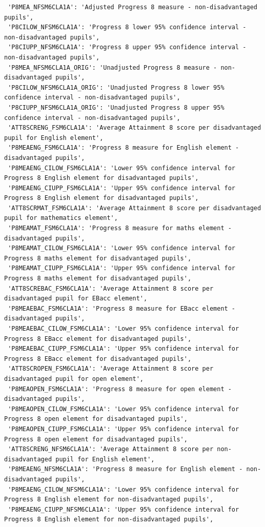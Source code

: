 \documentclass[
  letterpaper,
  DIV=11,
  numbers=noendperiod]{scrartcl}
\begin{document}
\begin{verbatim}
 'P8MEA_NFSM6CLA1A': 'Adjusted Progress 8 measure - non-disadvantaged pupils',
 'P8CILOW_NFSM6CLA1A': 'Progress 8 lower 95% confidence interval - non-disadvantaged pupils',
 'P8CIUPP_NFSM6CLA1A': 'Progress 8 upper 95% confidence interval - non-disadvantaged pupils',
 'P8MEA_NFSM6CLA1A_ORIG': 'Unadjusted Progress 8 measure - non-disadvantaged pupils',
 'P8CILOW_NFSM6CLA1A_ORIG': 'Unadjusted Progress 8 lower 95% confidence interval - non-disadvantaged pupils',
 'P8CIUPP_NFSM6CLA1A_ORIG': 'Unadjusted Progress 8 upper 95% confidence interval - non-disadvantaged pupils',
 'ATT8SCRENG_FSM6CLA1A': 'Average Attainment 8 score per disadvantaged pupil for English element',
 'P8MEAENG_FSM6CLA1A': 'Progress 8 measure for English element - disadvantaged pupils',
 'P8MEAENG_CILOW_FSM6CLA1A': 'Lower 95% confidence interval for Progress 8 English element for disadvantaged pupils',
 'P8MEAENG_CIUPP_FSM6CLA1A': 'Upper 95% confidence interval for Progress 8 English element for disadvantaged pupils',
 'ATT8SCRMAT_FSM6CLA1A': 'Average Attainment 8 score per disadvantaged pupil for mathematics element',
 'P8MEAMAT_FSM6CLA1A': 'Progress 8 measure for maths element - disadvantaged pupils',
 'P8MEAMAT_CILOW_FSM6CLA1A': 'Lower 95% confidence interval for Progress 8 maths element for disadvantaged pupils',
 'P8MEAMAT_CIUPP_FSM6CLA1A': 'Upper 95% confidence interval for Progress 8 maths element for disadvantaged pupils',
 'ATT8SCREBAC_FSM6CLA1A': 'Average Attainment 8 score per disadvantaged pupil for EBacc element',
 'P8MEAEBAC_FSM6CLA1A': 'Progress 8 measure for EBacc element - disadvantaged pupils',
 'P8MEAEBAC_CILOW_FSM6CLA1A': 'Lower 95% confidence interval for Progress 8 EBacc element for disadvantaged pupils',
 'P8MEAEBAC_CIUPP_FSM6CLA1A': 'Upper 95% confidence interval for Progress 8 EBacc element for disadvantaged pupils',
 'ATT8SCROPEN_FSM6CLA1A': 'Average Attainment 8 score per disadvantaged pupil for open element',
 'P8MEAOPEN_FSM6CLA1A': 'Progress 8 measure for open element - disadvantaged pupils',
 'P8MEAOPEN_CILOW_FSM6CLA1A': 'Lower 95% confidence interval for Progress 8 open element for disadvantaged pupils',
 'P8MEAOPEN_CIUPP_FSM6CLA1A': 'Upper 95% confidence interval for Progress 8 open element for disadvantaged pupils',
 'ATT8SCRENG_NFSM6CLA1A': 'Average Attainment 8 score per non-disadvantaged pupil for English element',
 'P8MEAENG_NFSM6CLA1A': 'Progress 8 measure for English element - non-disadvantaged pupils',
 'P8MEAENG_CILOW_NFSM6CLA1A': 'Lower 95% confidence interval for Progress 8 English element for non-disadvantaged pupils',
 'P8MEAENG_CIUPP_NFSM6CLA1A': 'Upper 95% confidence interval for Progress 8 English element for non-disadvantaged pupils',

\end{verbatim}
\end{document}
